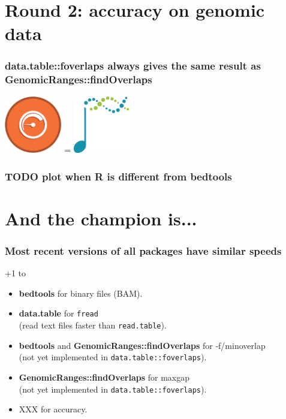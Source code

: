 \documentclass{beamer}
\begin{document}

\section{Round 2: accuracy on genomic data}

\begin{frame}
  \frametitle{data.table::foverlaps always gives the same result as
    GenomicRanges::findOverlaps}

    \includegraphics[height=2.5cm]{datatable} =
    \includegraphics[height=2.5cm]{bioconductor} 
  
\end{frame}

\begin{frame}
  \frametitle{TODO plot when R is different from bedtools}
  
\end{frame}

\section{And the champion is...}

\begin{frame}
  \frametitle{Most recent versions of all packages have similar
    speeds}
  +1 to
  \begin{itemize}
  \item \textbf{bedtools} for binary files (BAM).
  \item \textbf{data.table} for \texttt{fread}\\
    (read text files faster than \texttt{read.table}).
  \item \textbf{bedtools} and \textbf{GenomicRanges::findOverlaps} 
    for -f/minoverlap\\
    (not yet implemented in \texttt{data.table::foverlaps}).
  \item \textbf{GenomicRanges::findOverlaps} for maxgap \\
    (not yet implemented in \texttt{data.table::foverlaps}).
  \item XXX for accuracy.
  \end{itemize}

\end{frame}
\end{document}
